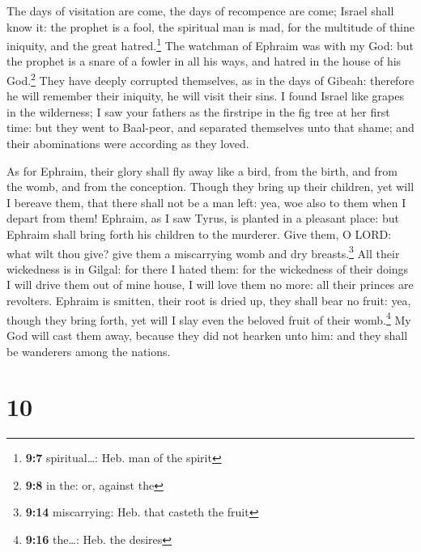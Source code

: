  The days of visitation are come, the days of recompence
are come; Israel shall know it: the prophet is a fool, the spiritual man
is mad, for the multitude of thine iniquity, and the great
hatred.\footnote{\textbf{9:7} spiritual\ldots: Heb. man of the spirit}
 The watchman of Ephraim was with my God: but the prophet
is a snare of a fowler in all his ways, and hatred in the house of his
God.\footnote{\textbf{9:8} in the: or, against the}  They
have deeply corrupted themselves, as in the days of Gibeah: therefore he
will remember their iniquity, he will visit their sins. 
I found Israel like grapes in the wilderness; I saw your fathers as the
firstripe in the fig tree at her first time: but they went to Baal-peor,
and separated themselves unto that shame; and their abominations were
according as they loved.

 As for Ephraim, their glory shall fly away like a bird,
from the birth, and from the womb, and from the conception.
 Though they bring up their children, yet will I bereave
them, that there shall not be a man left: yea, woe also to them when I
depart from them!  Ephraim, as I saw Tyrus, is planted in
a pleasant place: but Ephraim shall bring forth his children to the
murderer.  Give them, O LORD: what wilt thou give? give
them a miscarrying womb and dry breasts.\footnote{\textbf{9:14}
  miscarrying: Heb. that casteth the fruit}  All their
wickedness is in Gilgal: for there I hated them: for the wickedness of
their doings I will drive them out of mine house, I will love them no
more: all their princes are revolters.  Ephraim is
smitten, their root is dried up, they shall bear no fruit: yea, though
they bring forth, yet will I slay even the beloved fruit of their
womb.\footnote{\textbf{9:16} the\ldots: Heb. the desires}
 My God will cast them away, because they did not hearken
unto him: and they shall be wanderers among the nations.

\hypertarget{section-9}{%
\section{10}\label{section-9}}

